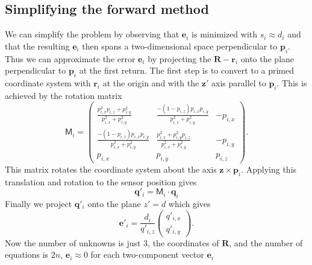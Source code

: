 \documentclass
[rmp,reprint,
twocolumn,amsmath,showkeys,letterpaper,raggedbottom]{revtex4-2}
\begin{document}
\subsection{Simplifying the forward method}

We can simplify the problem by observing that $\mathbf e_i$ is minimized
with $s_i \approx d_i$ and that the resulting $\mathbf e_i$ then spans a
two-dimensional space perpendicular to $\mathbf p_i$.  Thus we can
approximate the error $\mathbf e_i$ by projecting the $\mathbf R -
\mathbf r_i$ onto the plane perpendicular to $\mathbf p_i$ at the first
return.  The first step is to convert to a primed coordinate system with
$\mathbf r_i$ at the origin and with the $\mathbf z'$ axis parallel to
$\mathbf p_i$.  This is achieved by the rotation matrix
\begin{equation}
 \mathsf M_i = \begin{pmatrix}
\displaystyle
\frac{p_{i,x}^2 p_{i,z} + p_{i,y}^2}{p_{i,x}^2+p_{i,y}^2} &
\displaystyle
\frac{-(1 - p_{i,z}) p_{i,x} p_{i,y}}{p_{i,x}^2+p_{i,y}^2} &
-p_{i,x} \\[1ex]
\displaystyle
\frac{-(1 - p_{i,z}) p_{i,x} p_{i,y}}{p_{i,x}^2+p_{i,y}^2} &
\displaystyle
\frac{p_{i,x}^2 + p_{i,y}^2 p_{i,z}}{p_{i,x}^2+p_{i,y}^2} &
-p_{i,y} \\[1ex]
p_{i,x} & p_{i,y} & p_{i,z}
\end{pmatrix}.
\end{equation}
This matrix rotates the coordinate system about the axis $\mathbf z
\times \mathbf p_i$.  Applying this translation and rotation to the
sensor position gives
\begin{equation}
 \mathbf q'_i = \mathsf M_i \cdot \mathbf q_i
\end{equation}
Finally we project $\mathbf q'_i$ onto the plane $z' = d$ which gives
\begin{equation}
\mathbf e'_i = \frac{d_i}{q'_{i,z}}
\begin{pmatrix}
q'_{i,x}\\[1ex]
q'_{i,y}
\end{pmatrix}.
\end{equation}
Now the number of unknowns is just $3$, the coordinates of $\mathbf
R$, and the number of equations is $2n$, $\mathbf e_i \approx 0$
for each two-component vector $\mathbf e_i$
\end{document}

